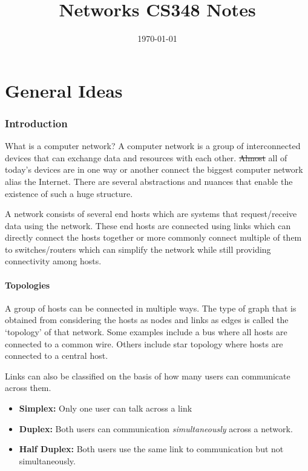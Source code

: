 \documentclass[12pt]{article}
\title{Networks CS348 Notes}
\author{}
\date{\today}
\newcommand{\tbox}[1]{\noindent\fbox{\parbox{\textwidth}{#1}}}
\begin{document}
\maketitle
\tableofcontents

\setlength{\parskip}{6pt}
\setlength{\parindent}{0pt}


\newpage
\noindent\tbox{
    \begin{center}
    \textbf{\Huge Lecture 1}
    \end{center}
}
\part{General Ideas}
\section{Introduction}
What is a computer network? A computer network is a group of interconnected devices that can exchange data and resources with each other.
\st{Almost} all of today's devices are in one way or another connect the biggest computer network alias the Internet. There are several 
abstractions and nuances that enable the existence of such a huge structure.

A network consists of several end hosts which are systems that request/receive data using the network. These end hosts are connected 
using links which can directly connect the hosts together or more commonly connect multiple of them to switches/routers which can 
simplify the network while still providing connectivity among hosts. 

\subsection{Topologies}

A group of hosts can be connected in multiple ways. The type of graph that is obtained from considering the 
hosts as nodes and links as edges is called the `topology' of that network. 
Some examples include a bus where all hosts are connected to a common wire. Others include star topology where hosts are connected to a central host. 

Links can also be classified on the basis of how many users can communicate across them.
\begin{itemize}
    \item \textbf{Simplex:} Only one user can talk across a link
    \item \textbf{Duplex:} Both users can communication \textit{simultaneously} across a network. 
    \item \textbf{Half Duplex:} Both users use the same link to communication but not simultaneously. 
\end{itemize}
\end{document}
